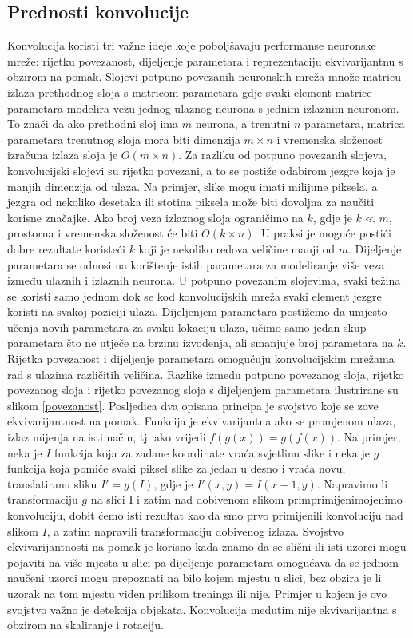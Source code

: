 \subsection{Prednosti konvolucije}
Konvolucija koristi tri važne ideje koje poboljšavaju performanse neuronske mreže: rijetku povezanost, dijeljenje parametara i reprezentaciju ekvivarijantnu s obzirom na pomak. 
Slojevi potpuno povezanih neuronskih mreža množe matricu izlaza prethodnog sloja s matricom parametara gdje svaki element matrice parametara modelira vezu jednog ulaznog neurona s jednim izlaznim neuronom. To znači da ako prethodni sloj ima $m$ neurona, a trenutni $n$ parametara, matrica parametara trenutnog sloja mora biti dimenzija $m \times n$ i vremenska složenost izračuna izlaza sloja je $O(m \times n)$.
Za razliku od potpuno povezanih slojeva, konvolucijski slojevi su rijetko povezani, a to se postiže odabirom jezgre koja je manjih dimenzija od ulaza. Na primjer, slike mogu imati milijune piksela, a jezgra od nekoliko desetaka ili stotina piksela može biti dovoljna za naučiti korisne značajke. Ako broj veza izlaznog sloja ograničimo na $k$, gdje je $k \ll m$, prostorna i vremenska složenost će biti $O(k \times n)$. U praksi je moguće postići dobre rezultate koristeći $k$ koji je nekoliko redova veličine manji od $m$.
Dijeljenje parametara se odnosi na korištenje istih parametara za modeliranje više veza između ulaznih i izlaznih neurona. U potpuno povezanim slojevima, svaki težina se koristi samo jednom dok se kod konvolucijskih mreža svaki element jezgre koristi na svakoj poziciji ulaza. Dijeljenjem parametara postižemo da umjesto učenja novih parametara za svaku lokaciju ulaza, učimo samo jedan skup parametara što ne utječe na brzinu izvođenja, ali smanjuje broj parametara na $k$.
Rijetka povezanost i dijeljenje parametara omogućuju konvolucijskim mrežama rad s ulazima različitih veličina.
Razlike između potpuno povezanog sloja, rijetko povezanog sloja i rijetko povezanog sloja s dijeljenjem parametara ilustrirane su slikom \ref{povezanost}.
Posljedica dva opisana principa je svojstvo koje se zove ekvivarijantnost na pomak. Funkcija je ekvivarijantna ako se promjenom ulaza, izlaz mijenja na isti način, tj. ako vrijedi $f(g(x)) = g(f(x))$. Na primjer, neka je $I$ funkcija koja za zadane koordinate vraća svjetlinu slike i neka je $g$ funkcija koja pomiče svaki piksel slike za jedan u desno i vraća novu, translatiranu sliku $I' = g(I)$, gdje je $I'(x, y) = I(x-1, y)$. Napravimo li transformaciju $g$ na slici I i zatim nad dobivenom slikom primprimijenimojenimo konvoluciju, dobit ćemo isti rezultat kao da smo prvo primijenili konvoluciju nad slikom $I$, a zatim napravili transformaciju dobivenog izlaza. Svojstvo ekvivarijantnosti na pomak je korisno kada znamo da se slični ili isti uzorci mogu pojaviti na više mjesta u slici pa dijeljenje parametara omogućava da se jednom naučeni uzorci mogu prepoznati na bilo kojem mjestu u slici, bez obzira je li uzorak na tom mjestu viđen prilikom treninga ili nije. Primjer u kojem je ovo svojstvo važno je detekcija objekata. 
Konvolucija međutim nije ekvivarijantna s obzirom na skaliranje i rotaciju.


